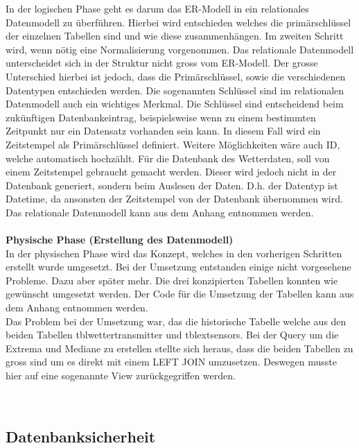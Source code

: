 In der logischen Phase geht es darum das ER-Modell in ein relationales Datenmodell zu überführen. Hierbei wird entschieden welches die primärschlüssel der einzelnen Tabellen sind und wie diese zusammenhängen. Im zweiten Schritt wird, wenn nötig eine Normalisierung vorgenommen. Das relationale Datenmodell unterscheidet sich in der Struktur nicht gross vom ER-Modell. Der grosse Unterschied hierbei ist jedoch, dass die Primärschlüssel, sowie die verschiedenen Datentypen entschieden werden. Die sogenannten Schlüssel sind im relationalen Datenmodell auch ein wichtiges Merkmal. Die Schlüssel sind entscheidend beim zukünftigen Datenbankeintrag, beispielsweise wenn zu einem bestimmten Zeitpunkt nur ein Datensatz vorhanden sein kann. In diesem Fall wird ein Zeitstempel als Primärschlüssel definiert. Weitere Möglichkeiten wäre auch ID, welche automatisch hochzählt. Für die Datenbank des Wetterdaten, soll von einem Zeitstempel gebraucht gemacht werden. Dieser wird jedoch nicht in der Datenbank generiert, sondern beim Auslesen der Daten. D.h. der Datentyp ist Datetime, da ansonsten der Zeitstempel von der Datenbank übernommen wird. Das relationale Datenmodell kann aus dem Anhang  entnommen werden.\\ \\


\textbf{Physische Phase (Erstellung des Datenmodell)}\\

In der physischen Phase wird das Konzept, welches in den vorherigen Schritten erstellt wurde umgesetzt. Bei der Umsetzung entstanden einige nicht vorgesehene Probleme. Dazu aber später mehr. Die drei konzipierten Tabellen konnten wie gewünscht umgesetzt werden. Der Code für die Umsetzung der Tabellen kann aus dem Anhang entnommen werden.\\
Das Problem bei der Umsetzung war, das die historische Tabelle welche aus den beiden Tabellen tblwettertransmitter und tblextsensors. Bei der Query um die Extrema und Mediane zu erstellen stellte sich heraus, dass die beiden Tabellen zu gross sind um es direkt mit einem LEFT JOIN umzusetzen. Deswegen musste hier auf eine sogenannte View zurückgegriffen werden.   



\\

\subsection{Datenbanksicherheit}
